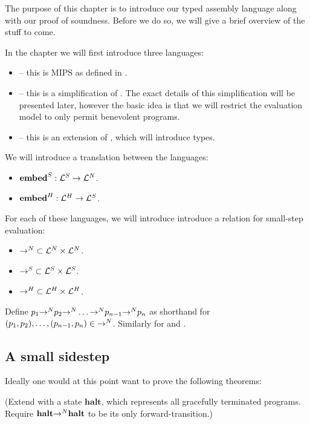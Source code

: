 
The purpose of this chapter is to introduce our typed assembly language along
with our proof of soundness. Before we do so, we will give a brief overview of
the stuff to come.

In the chapter we will first introduce three languages:

\begin{itemize}
\item \native\lang -- this is MIPS as defined in \cite{mipssys}.
\item \simple\lang -- this is a simplification of \native\lang. The exact
  details of this simplification will be presented later, however the basic idea
  is that we will restrict the evaluation model to only permit benevolent
  programs.
\item \high\lang -- this is an extension of \simple\lang, which will
  introduce types.
\end{itemize}

We will introduce a translation between the languages:

\begin{itemize}
\item ${{{\mathbf{embed}}}^S} : {{{\mathcal{L}}}^S} -> {{{\mathcal{L}}}^N}$.
\item ${{{\mathbf{embed}}}^H} : {{{\mathcal{L}}}^H} -> {{{\mathcal{L}}}^S}$.
\end{itemize}

For each of these languages, we will introduce introduce a relation for
small-step evaluation:

\begin{itemize}
\item ${{->}^N} \subset {\ensuremath{{{\mathcal{L}}}^N}} \times {\ensuremath{{{\mathcal{L}}}^N}}$.
\item ${{->}^S} \subset {\ensuremath{{{\mathcal{L}}}^S}} \times {\ensuremath{{{\mathcal{L}}}^S}}$.
\item ${{->}^H} \subset {\ensuremath{{{\mathcal{L}}}^H}} \times {\ensuremath{{{\mathcal{L}}}^H}}$.
\end{itemize}

Define
$p_1 {{->}^N} p_2 {{->}^N} \dots {\ensuremath{{->}^N}} p_{n-1} {{->}^N} p_n$ as
shorthand for $(p_1, p_2), \dots, (p_{n-1}, p_n) \in {\ensuremath{{->}^N}}$. Similarly for
\simple{->} and \high{->}.

\subsection{A small sidestep}
\label{sidestep}
Ideally one would at this point want to prove the following theorems:

(Extend \native\lang with a state $\mathbf{halt}$, which represents all
gracefully terminated programs. Require
$\mathbf{halt} {{->}^N} \mathbf{halt}$ to be its only forward-transition.)

